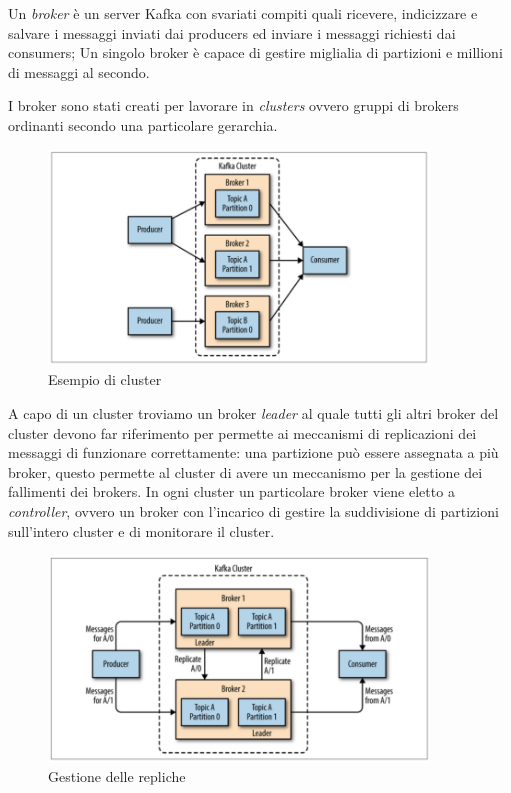 \documentclass[]{article}
\begin{document}
Un \emph{broker} è un server Kafka con svariati compiti quali ricevere,
indicizzare e salvare i messaggi inviati dai producers ed inviare i
messaggi richiesti dai consumers; Un singolo broker è capace di gestire
miglialia di partizioni e millioni di messaggi al secondo.

I broker sono stati creati per lavorare in \emph{clusters} ovvero gruppi
di brokers ordinanti secondo una particolare gerarchia.

\begin{figure}
\centering
\includegraphics[width=0.90000\textwidth]{../images/kafka-cluster.png}
\caption{Esempio di cluster \label{figure_5}}
\end{figure}

A capo di un cluster troviamo un broker \emph{leader} al quale tutti gli
altri broker del cluster devono far riferimento per permette ai
meccanismi di replicazioni dei messaggi di funzionare correttamente: una
partizione può essere assegnata a più broker, questo permette al cluster
di avere un meccanismo per la gestione dei fallimenti dei brokers. In
ogni cluster un particolare broker viene eletto a \emph{controller},
ovvero un broker con l'incarico di gestire la suddivisione di partizioni
sull'intero cluster e di monitorare il cluster.

\begin{figure}
\centering
\includegraphics[width=0.90000\textwidth]{../images/partition-replica.png}
\caption{Gestione delle repliche \label{figure_5}}
\end{figure}
\end{document}
